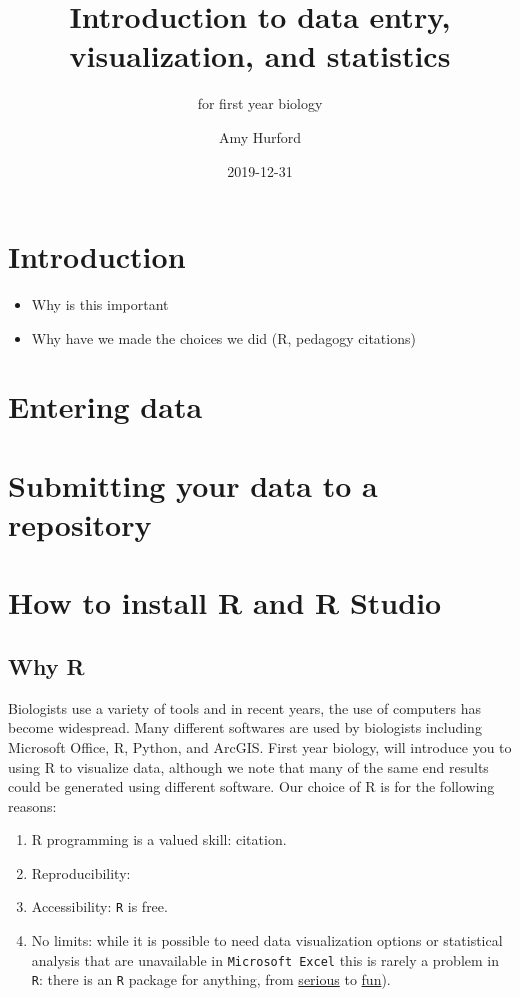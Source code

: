\documentclass[]{book}
\title{Introduction to data entry, visualization, and statistics}
\subtitle{for first year biology}
\author{Amy Hurford}
\date{2019-12-31}
\providecommand{\tightlist}{%
  \setlength{\itemsep}{0pt}\setlength{\parskip}{0pt}}
\begin{document}
\maketitle

{
\setcounter{tocdepth}{1}
\tableofcontents
}
\chapter{Introduction}\label{introduction}

\begin{itemize}
\tightlist
\item
  Why is this important
\item
  Why have we made the choices we did (R, pedagogy citations)
\end{itemize}

\chapter{Entering data}\label{entering-data}

\chapter{Submitting your data to a
repository}\label{submitting-your-data-to-a-repository}

\chapter{How to install R and R
Studio}\label{how-to-install-r-and-r-studio}

\section{Why R}\label{why-r}

Biologists use a variety of tools and in recent years, the use of
computers has become widespread. Many different softwares are used by
biologists including Microsoft Office, R, Python, and ArcGIS. First year
biology, will introduce you to using R to visualize data, although we
note that many of the same end results could be generated using
different software. Our choice of R is for the following reasons:

\begin{enumerate}
\def\labelenumi{\arabic{enumi}.}
\item
  R programming is a valued skill: citation.
\item
  Reproducibility:
\item
  Accessibility: \texttt{R} is free.
\item
  No limits: while it is possible to need data visualization options or
  statistical analysis that are unavailable in \texttt{Microsoft\ Excel}
  this is rarely a problem in \texttt{R}: there is an \texttt{R} package
  for anything, from
  \href{https://rviews.rstudio.com/2017/10/09/population-modeling-in-r/}{serious}
  to
  \href{https://www.r-bloggers.com/useless-but-fun-r-packages/}{fun}).
\end{enumerate}
\end{document}
